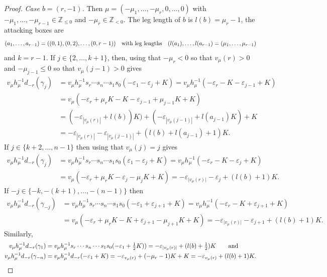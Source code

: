 \documentclass[11pt]{article}
\theoremstyle{plain}
\theoremstyle{definition}
\theoremstyle{remark}
\numberwithin{equation}{section}
\def\ZZ{\mathbb{Z}}
\newcounter{r}
\newcounter{s}
\begin{document}
\begin{proof}
\medskip\noindent
\emph{Case $b=(r,-1)$.}
Then $\mu=(-\mu_1, \ldots, -\mu_r, 0, \ldots, 0)$ with $-\mu_1, \ldots, -\mu_{r-1}\in \ZZ_{\le0}$ and $-\mu_r\in \ZZ_{<0}$.
The leg length of $b$ is $l(b) = \mu_r-1$, the attacking boxes are 
$$(a_1, \ldots, a_{r-1}) = ((0,1), (0,2), \ldots, (0,r-1))
\quad\hbox{with leg lengths}\quad
(l(a_1), \ldots, l(a_{r-1}) = (\mu_1, \ldots, \mu_{r-1})
$$
and $k=r-1$.
If $j \in \{2, \ldots, k+1\}$, then, using that $-\mu_r<0$ so that $v_\mu(r)>0$ and $-\mu_{j-1}\le 0$ so that $v_\mu(j-1)>0$ gives
\begin{align*}
v_\mu h_\mu^{-1}d_{-r}(\gamma_{j}) 
&=v_\mu h_\mu^{-1}s_r\cdots s_n\cdots s_1s_0(-\varepsilon_{1} - \varepsilon_{j} + K)  
=v_\mu h_\mu^{-1}(-\varepsilon_{r} -K - \varepsilon_{j-1} + K)  \\
&=v_\mu (-\varepsilon_{r} +\mu_rK -K - \varepsilon_{j-1} +\mu_{j-1} K+ K)  \\
&= (-\varepsilon_{|v_{\mu}(r)|} + l(b))K)
+(-\varepsilon_{|v_{\mu}(j-1)|} + l(a_{j-1}) K)
+ K \\
&= -\varepsilon_{|v_{\mu}(r)|} -\varepsilon_{|v_{\mu}(j-1)|} + (l(b) + l(a_{j-1}) + 1)K.
\end{align*}
If $j \in \{k+2, \ldots, n-1\}$ then using that $v_\mu(j)=j$ gives
\begin{align*}
v_\mu h_\mu^{-1}d_{-r}(\gamma_{j}) 
&=v_\mu h_\mu^{-1}s_r\cdots s_n\cdots s_1s_0(\varepsilon_1-\varepsilon_j+K) 
=v_\mu h_\mu^{-1}(-\varepsilon_r-K-\varepsilon_j+K) \\
&=v_\mu (-\varepsilon_r+\mu_rK-\varepsilon_j-\mu_j K+K) 
= -\varepsilon_{|v_{\mu}(r)\vert} -\varepsilon_j + (l(b) + 1)K.
\end{align*}
If $-j \in \{-k, -(k+1), \ldots, -(n-1)\}$ then
\begin{align*}
v_\mu h_\mu^{-1}d_{-r}(\gamma_{-j}) 
&= v_\mu h_\mu^{-1}s_r\cdots s_n\cdots s_1s_0(-\varepsilon_{1} + \varepsilon_{j+1} + K)  
= v_\mu h_\mu^{-1}(-\varepsilon_{r} -K+ \varepsilon_{j+1} + K)  \\
&= v_\mu (-\varepsilon_{r} +\mu_r K-K+ \varepsilon_{j+1} -\mu_{j+1}K+ K)  
= - \varepsilon_{\vert v_{\mu}(r)\vert }-\varepsilon_{j+1} + (l(b) + 1)K.
\end{align*}
Similarly,
\begin{align*}
v_\mu h_\mu^{-1}d_{-r}(\gamma_{1}) 
&=v_\mu h_\mu^{-1}s_r\cdots s_n\cdots s_1s_0(-\varepsilon_1+\hbox{$\frac12$}K))  
= -\varepsilon_{\vert v_{\mu}(r)\vert } + (l(b) + \textstyle\frac{1}{2})K \qquad\hbox{and} \\
v_\mu h_\mu^{-1}d_{-r}(\gamma_{-n}) 
&= v_\mu h_\mu^{-1}d_{-r}(-\varepsilon_{1} + K) = -\varepsilon_{v_{\mu}(r)} + (- \mu_{r}-1 )K + K
= -\varepsilon_{v_{\mu}(r)} + (l(b) + 1)K.
\end{align*}
\end{proof}
\end{document}
